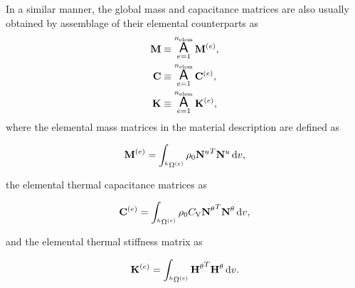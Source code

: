 In a similar manner, the global mass and capacitance matrices are also usually obtained by assemblage of their elemental counterparts as
\begin{align}
  \mathbf M &\equiv \operatorname*{\text{\Large $ \mathsf{A} $}}_{e=1}^{n_\text{elem}} \mathbf M^{(e)},\\
  \mathbf C &\equiv \operatorname*{\text{\Large $ \mathsf{A} $}}_{e=1}^{n_\text{elem}} \mathbf C^{(e)},\\
  \mathbf K &\equiv \operatorname*{\text{\Large $ \mathsf{A} $}}_{e=1}^{n_\text{elem}} \mathbf K^{(e)},
\end{align}
where the elemental mass matrices in the material description are defined as
\begin{highlight}
  \begin{equation}
    \mathbf M^{(e)} = \int_{^h\Omega^{(e)}} \rho_0 {\mathbf N^u}^T\mathbf N^u\,\mathrm{d} v,
  \end{equation}
\end{highlight}
the elemental thermal capacitance matrices as
\begin{highlight}
  \begin{equation}
    \mathbf C^{(e)} = \int_{^h\Omega^{(e)}} \rho_0 C_\mathrm{V} {\mathbf N^\theta}^T\mathbf N^\theta\,\mathrm{d} v,
  \end{equation}
\end{highlight}
and the elemental thermal stiffness matrix as
\begin{highlight}
\begin{equation}
\mathbf K^{(e)} = \int_{^h\Omega^{(e)}} {\mathbf H^{\theta}}^T\mathbf H^{\theta}\,\mathrm{d} v.
\end{equation}
\end{highlight}

